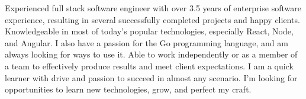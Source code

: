 

\begin{cvparagraph}

Experienced full stack software engineer with over 3.5 years of enterprise software experience, resulting in several successfully completed projects and happy clients. Knowledgeable in most of today's popular technologies, especially React, Node, and Angular. I also have a passion for the Go programming language, and am always looking for ways to use it. Able to work independently or as a member of a team to effectively produce results and meet client expectations. I am a quick learner with drive and passion to succeed in almost any scenario. I’m looking for opportunities to learn new technologies, grow, and perfect my craft.
\end{cvparagraph}
